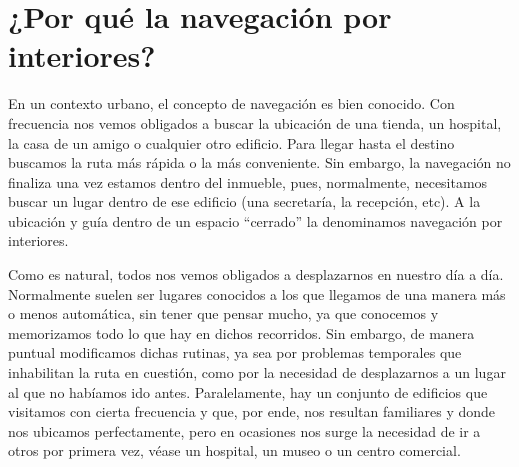 



\section{¿Por qué la navegación por interiores?}


En un contexto urbano, el concepto de navegación es bien conocido. Con frecuencia nos vemos obligados a buscar la ubicación de una tienda, un hospital, la casa de un amigo o cualquier otro edificio. Para llegar hasta el destino buscamos la ruta más rápida o la más conveniente. Sin embargo, la navegación no finaliza una vez estamos dentro del inmueble, pues, normalmente, necesitamos buscar un lugar dentro de ese edificio (una secretaría, la recepción, etc). A la ubicación y guía dentro de un espacio ``cerrado'' la denominamos navegación por interiores.

Como es natural, todos nos vemos obligados a desplazarnos en nuestro día a día. Normalmente suelen ser lugares conocidos a los que llegamos de una manera más o menos automática, sin tener que pensar mucho, ya que conocemos y memorizamos todo lo que hay en dichos recorridos. Sin embargo, de manera puntual modificamos dichas rutinas, ya sea por problemas temporales que inhabilitan la ruta en cuestión, como por la necesidad de desplazarnos a un lugar al que no habíamos ido antes. Paralelamente, hay un conjunto de edificios que visitamos con cierta frecuencia y que, por ende, nos resultan familiares y donde nos ubicamos perfectamente, pero en ocasiones nos surge la necesidad de ir a otros por primera vez, véase un hospital, un museo o un centro comercial. 

